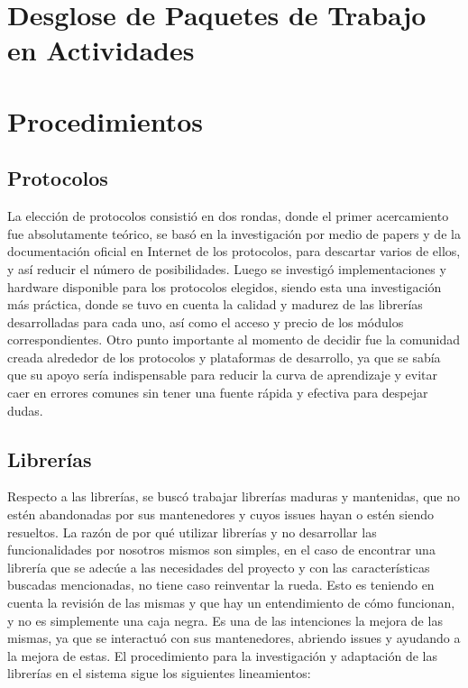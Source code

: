 \section{Desglose de Paquetes de Trabajo en Actividades}

\section{Procedimientos}

\subsection{Protocolos}
La elección de protocolos consistió en dos rondas, donde el primer acercamiento fue absolutamente teórico, se basó en la investigación por medio de papers y de la documentación oficial en Internet de los protocolos, para descartar varios de ellos, y así reducir el número de posibilidades.
Luego se investigó implementaciones y hardware disponible para los protocolos elegidos, siendo esta una investigación más práctica, donde se tuvo en cuenta la calidad y madurez de las librerías desarrolladas para cada uno, así como el acceso y precio de los módulos correspondientes. Otro punto importante al momento de decidir fue la comunidad creada alrededor de los protocolos y plataformas de desarrollo, ya que se sabía que su apoyo sería indispensable para reducir la curva de aprendizaje y evitar caer en errores comunes sin tener una fuente rápida y efectiva para despejar dudas.

\subsection{Librerías}

Respecto a las librerías, se buscó trabajar librerías maduras y mantenidas, que no estén abandonadas por sus mantenedores y cuyos issues hayan o estén siendo resueltos.
La razón de por qué utilizar librerías y no desarrollar las funcionalidades por nosotros mismos son simples, en el caso de encontrar una librería que se adecúe a las necesidades del proyecto y con las características buscadas mencionadas, no tiene caso reinventar la rueda. Esto es teniendo en cuenta la revisión de las mismas y que hay un entendimiento de cómo funcionan, y no es simplemente una caja negra. Es una de las intenciones la mejora de las mismas, ya que se interactuó con sus mantenedores, abriendo issues y ayudando a la mejora de estas.
El procedimiento para la investigación y adaptación de las librerías en el sistema sigue los siguientes lineamientos:

